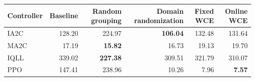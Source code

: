 \begin{tabular}{lrrrrr}
\hline
Controller & Baseline & Random grouping & Domain randomization & Fixed WCE & Online WCE \\
\hline
IA2C & 128.20 & 224.97 & \textbf{106.04} & 132.48 & 131.64 \\
MA2C & 17.19 & \textbf{15.82} & 16.73 & 19.13 & 19.70 \\
IQLL & 339.02 & \textbf{227.38} & 309.51 & 321.79 & 310.07 \\
PPO & 147.41 & 238.96 & 10.26 & 7.96 & \textbf{7.57} \\
\hline
\end{tabular}
